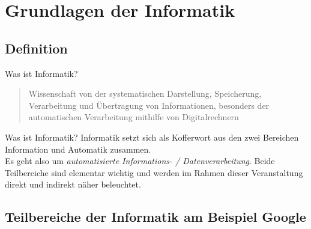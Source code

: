 \newcommand{\decktitle}{Grundlagen der Informatik}
%
%



		
  
\section{Grundlagen der Informatik}  
    \subsection{Definition}
    
    \begin{frame}{Was ist Informatik?}
        \begin{definition}
         \begin{quote}
            Wissenschaft von der systematischen Darstellung, Speicherung, Verarbeitung und Übertragung von Informationen, besonders der automatischen Verarbeitung mithilfe von Digitalrechnern \cite{claus2006duden}
            \end{quote}  
        \end{definition}
        
    \end{frame}
          
    \begin{frame}{Was ist Informatik?}
        Informatik setzt sich als Kofferwort aus den zwei Bereichen \alert{Information} und \alert{Automatik} zusammen. 
        \\[2\baselineskip]
        
        Es geht also um \textit{automatisierte Informations- / Datenverarbeitung}. Beide Teilbereiche sind elementar wichtig und werden im Rahmen dieser Veranstaltung direkt und indirekt näher beleuchtet.
    \end{frame}
    
    \subsection{Teilbereiche der Informatik am Beispiel Google}
    
